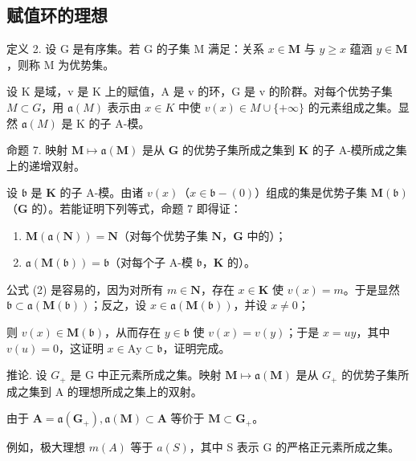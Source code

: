\subsection{赋值环的理想}

定义 2. 设 G 是有序集。若 G 的子集 M 满足：关系 \(x \in \mathbf{M}\) 与 \(y \geqslant x\) 蕴涵 \(y \in \mathbf{M}\)，则称 M 为优势集。

设 K 是域，v 是 K 上的赋值，A 是 v 的环，G 是 v 的阶群。对每个优势子集 \(M \subset G\)，用 \(\mathfrak{a}(M)\) 表示由 \(x \in K\) 中使 \(v(x) \in M \cup \{+\infty\}\) 的元素组成之集。显然 \(\mathfrak{a}(M)\) 是 K 的子 A-模。

命题 7. 映射 \(\mathbf{M} \mapsto \mathfrak{a}(\mathbf{M})\) 是从 \(\mathbf{G}\) 的优势子集所成之集到 \(\mathbf{K}\) 的子 A-模所成之集上的递增双射。

设 \(\mathfrak{b}\) 是 \(\mathbf{K}\) 的子 A-模。由诸 \(v(x)\)（\(x \in \mathfrak{b} - (0)\)）组成的集是优势子集 \(\mathbf{M}(\mathfrak{b})\)（\(\mathbf{G}\) 的）。若能证明下列等式，命题 7 即得证：

\begin{enumerate}
\def\labelenumi{(\arabic{enumi})}
\setcounter{enumi}{1}
\item
  \(\mathbf{M}(\mathfrak{a}(\mathbf{N})) = \mathbf{N}\)（对每个优势子集 \(\mathbf{N}\)，\(\mathbf{G}\) 中的）；
\item
  \(\mathfrak{a}(\mathbf{M}(\mathfrak{b})) = \mathfrak{b}\)（对每个子 A-模 \(\mathfrak{b}\)，\(\mathbf{K}\) 的）。
\end{enumerate}

公式 (2) 是容易的，因为对所有 \(m \in \mathbf{N}\)，存在 \(x \in \mathbf{K}\) 使 \(v(x) = m\)。于是显然 \(\mathfrak{b} \subset \mathfrak{a}(\mathbf{M}(\mathfrak{b}))\)；反之，设 \(x \in \mathfrak{a}(\mathbf{M}(\mathfrak{b}))\)，并设 \(x \neq 0\)；

则 \(v(x) \in \mathbf{M}(\mathfrak{b})\)，从而存在 \(y \in \mathfrak{b}\) 使 \(v(x) = v(y)\)；于是 \(x = uy\)，其中 \(v(u) = 0\)，这证明 \(x \in \mathrm{Ay} \subset \mathfrak{b}\)，证明完成。

推论. 设 \(G_{+}\) 是 G 中正元素所成之集。映射 \(\mathbf{M} \mapsto \mathfrak{a}(\mathbf{M})\) 是从 \(G_{+}\) 的优势子集所成之集到 A 的理想所成之集上的双射。

由于 \(\mathbf{A} = \mathfrak{a}(\mathbf{G}_{+}),\mathfrak{a}(\mathbf{M})\subset \mathbf{A}\) 等价于 \(\mathbf{M}\subset \mathbf{G}_{+}\)。

例如，极大理想 \(m(A)\) 等于 \(a(S)\)，其中 S 表示 G 的严格正元素所成之集。
\relax{}
